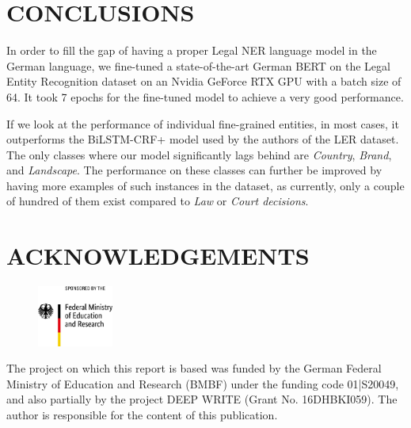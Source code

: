 \documentclass[a4paper,twoside]{article}
\begin{document}
\section{\uppercase{Conclusions}}
\label{sec:conclusion}

In order to fill the gap of having a proper Legal NER language model in the German language, we fine-tuned a state-of-the-art German BERT on the Legal Entity Recognition dataset on an Nvidia GeForce RTX GPU with a batch size of 64. It took 7 epochs for the fine-tuned model to achieve a very good performance.

If we look at the performance of individual fine-grained entities, in most cases, it outperforms the BiLSTM-CRF+ model used by the authors of the LER dataset. The only classes where our model significantly lags behind are \textit{Country}, \textit{Brand}, and \textit{Landscape}. The performance on these classes can further be improved by having more examples of such instances in the dataset, as currently, only a couple of hundred of them exist compared to \textit{Law} or \textit{Court decisions}.

\vfill
\section*{\uppercase{Acknowledgements}}

\begin{figure}[h]
\includegraphics[width=2.5cm]{latex/BMBF.jpeg}
\end{figure} 

The project on which this report is based was funded by the German Federal Ministry of Education and Research (BMBF) under the funding code 01|S20049, and also partially by the project DEEP WRITE (Grant No. 16DHBKI059). The author is responsible for the content of this publication.



{\small
}
\end{document}
